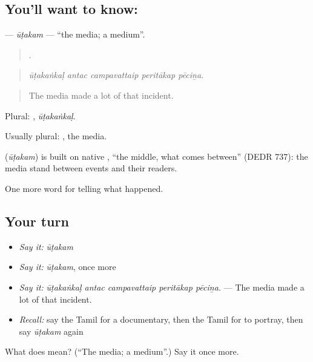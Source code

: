 \subsection*{You'll want to know: }
\textbf{} — \emph{ūṭakam} — \textquotedblleft{}the media; a medium\textquotedblright{}.

\begin{quote}
    .
\end{quote}

\begin{quote}
\emph{ūṭakaṅkaḷ antac campavattaip peritākap pēciṉa.}
\end{quote}

\begin{quote}
The media made a lot of that incident.
\end{quote}

Plural: , \emph{ūṭakaṅkaḷ}.

Usually plural: , the media.

\begin{cousinweb}
\textbf{} (\emph{ūṭakam}) is built on native , \textquotedblleft{}the middle, what comes between\textquotedblright{} (DEDR 737): the media stand between events and their readers.
\end{cousinweb}

\begin{grammarlens}[title={What you've built}]
One more word for telling what happened.
\end{grammarlens}

\subsection*{Your turn}
\begin{itemize}
\raggedright
  \item \emph{Say it:} \emph{ūṭakam}
  \item \emph{Say it:} \emph{ūṭakam}, once more
  \item \emph{Say it:} \emph{ūṭakaṅkaḷ antac campavattaip peritākap pēciṉa.} — The media made a lot of that incident.
  \item \emph{Recall:} say the Tamil for a documentary, then the Tamil for to portray, then say \emph{ūṭakam} again
\end{itemize}

\begin{tcolorbox}[breakable,colback=teal!4,colframe=teal!35!black,title={Before you move on}]
What does  mean? (\textquotedblleft{}The media; a medium\textquotedblright{}.) Say it once more.
\end{tcolorbox}
